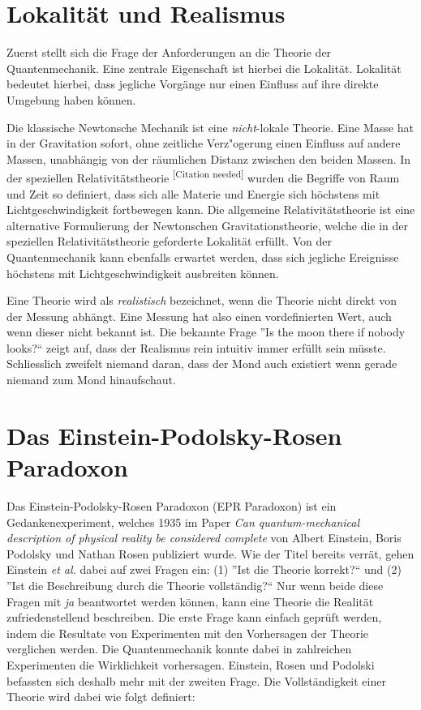 \begin{refsection}
\section{Lokalit\"at und Realismus\label{section:bell:lokalitaet}}
Zuerst stellt sich die Frage der Anforderungen an die Theorie der
Quantenmechanik. Eine zentrale Eigenschaft ist hierbei die Lokalit\"at.
Lokalit\"at bedeutet hierbei, dass jegliche Vorg\"ange nur einen Einfluss
auf ihre direkte Umgebung haben k\"onnen.

Die klassische Newtonsche Mechanik ist eine \emph{nicht}-lokale 
Theorie. Eine Masse hat in der Gravitation sofort, ohne zeitliche 
Verz"ogerung einen Einfluss auf andere Massen, unabh\"angig von der
r\"aumlichen Distanz zwischen den beiden Massen. 
In der speziellen Relativit\"atstheorie 
\textsuperscript{[Citation needed]}
wurden die Begriffe von Raum und Zeit so definiert, dass sich alle
Materie und Energie sich h\"ochstens mit Lichtgeschwindigkeit fortbewegen
kann. 
Die allgemeine Relativit\"atstheorie ist eine alternative Formulierung
der Newtonschen Gravitationstheorie, welche die in der speziellen
Relativit\"atstheorie geforderte Lokalit\"at erf\"ullt.
Von der Quantenmechanik kann ebenfalls erwartet werden, dass sich
jegliche Ereignisse h\"ochstens mit Lichtgeschwindigkeit ausbreiten
k\"onnen.

Eine Theorie wird als \emph{realistisch} bezeichnet, wenn die Theorie
nicht direkt von der Messung abh\"angt. Eine Messung hat also einen
vordefinierten Wert, auch wenn dieser nicht bekannt ist.
Die bekannte Frage ''Is the moon there if nobody looks?{``} zeigt auf,
dass der Realismus rein intuitiv immer erf\"ullt sein m\"usste. Schliesslich
zweifelt niemand daran, dass der Mond auch existiert wenn gerade niemand
zum Mond hinaufschaut.

\section{Das Einstein-Podolsky-Rosen Paradoxon}
Das Einstein-Podolsky-Rosen Paradoxon (EPR Paradoxon) ist ein 
Gedankenexperiment, welches 1935 im Paper \cite{Bell:Einstein1935}
\emph{Can quantum-mechanical description of physical reality be considered complete}
von Albert Einstein, Boris Podolsky und Nathan Rosen publiziert wurde.
Wie der Titel bereits verr\"at, gehen Einstein \emph{et al.} dabei auf
zwei Fragen ein: 
(1) ''Ist die Theorie korrekt?``
und 
(2) ''Ist die Beschreibung durch die Theorie vollst\"andig?`` 
Nur wenn beide diese Fragen mit \emph{ja} beantwortet werden k\"onnen, kann
eine Theorie die Realit\"at zufriedenstellend beschreiben.
Die erste Frage kann einfach gepr\"uft werden, indem die Resultate von
Experimenten mit den Vorhersagen der Theorie verglichen werden. 
Die Quantenmechanik konnte dabei in zahlreichen Experimenten die Wirklichkeit
vorhersagen. 
Einstein, Rosen und Podolski befassten sich deshalb mehr mit der zweiten
Frage. 
Die Vollst\"andigkeit einer Theorie wird dabei wie folgt definiert:


\end{refsection}
